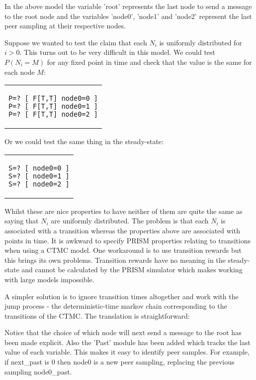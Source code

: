\documentclass[a4paper,10pt]{article}
\newcommand{\prismmodel}[1]{
  \begin{quotation}
  \footnotesize
  
  \end{quotation}
}
\newenvironment{prismprop}[0]{
  \begin{center}
  \begin{tabular}{c}
  \footnotesize
}{
  \end{tabular}
  \end{center}
}
\begin{document}
In the above model the variable 'root' represents the last node to send a message to the root node and the variables 'node0', 'node1' and 'node2' represent the last peer sampling at their respective nodes.

Suppose we wanted to test the claim that each $N_i$ is uniformly distributed for $i>0$. This turns out to be very difficult in this model. We could test $P(N_i = M)$ for any fixed point in time and check that the value is the same for each node $M$:

\begin{prismprop}
\begin{lstlisting}
P=? [ F[T,T] node0=0 ]
P=? [ F[T,T] node0=1 ]
P=? [ F[T,T] node0=2 ]
\end{lstlisting}
\end{prismprop}

Or we could test the same thing in the steady-state:

\begin{prismprop}
\begin{lstlisting}
S=? [ node0=0 ]
S=? [ node0=1 ]
S=? [ node0=2 ]
\end{lstlisting}
\end{prismprop}

Whilst these are nice properties to have neither of them are quite the same as saying that $N_i$ are uniformly distributed. The problem is that each $N_i$ is associated with a transition whereas the properties above are associated with points in time. It is awkward to specify PRISM properties relating to transitions when using a CTMC model. One workaround is to use transition rewards but this brings its own problems. Transition rewards have no meaning in the steady-state and cannot be calculated by the PRISM simulator which makes working with large models impossible.

A simpler solution is to ignore transition times altogether and work with the jump process - the deterministic-time markov chain corresponding to the transitions of the CTMC. The translation is straightforward:

\prismmodel{dtmc_single}

Notice that the choice of which node will next send a message to the root has been made explicit. Also the 'Past' module has been added which tracks the last value of each variable. This makes it easy to identify peer samples. For example, if next\_past is 0 then node0 is a new peer sampling, replacing the previous sampling node0\_past.
\end{document}
